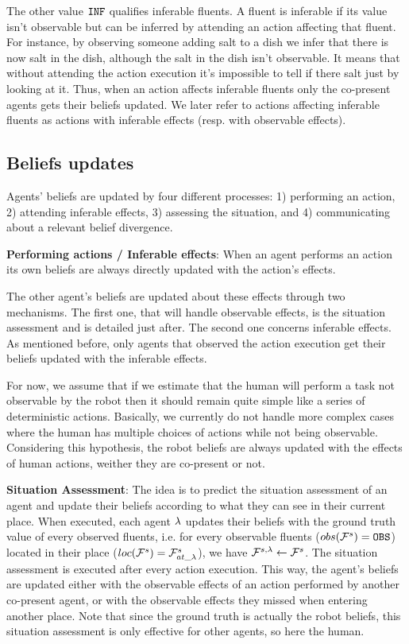 \documentclass[letterpaper]{article} %
\begin{document}
The other value $\texttt{INF}$ qualifies inferable fluents. A fluent is inferable if its value isn't observable but can be inferred by attending an action affecting that fluent. For instance, by observing someone adding salt to a dish we infer that there is now salt in the dish, although the salt in the dish isn't observable. It means that without attending the action execution it's impossible to tell if there salt just by looking at it. Thus, when an action affects inferable fluents only the co-present agents gets their beliefs updated. We later refer to actions affecting inferable fluents as actions with inferable effects (resp. with observable effects).


\subsection{Beliefs updates}

Agents' beliefs are updated by four different processes: 1) performing an action, 2) attending inferable effects, 3) assessing the situation, and 4) communicating about a relevant belief divergence.  

\textbf{Performing actions / Inferable effects}: 
When an agent performs an action its own beliefs are always directly updated with the action's effects.

The other agent's beliefs are updated about these effects through two mechanisms. The first one, that will handle observable effects, is the situation assessment and is detailed just after. 
The second one concerns inferable effects. As mentioned before, only agents that observed the action execution get their beliefs updated with the inferable effects.

For now, we assume that if we estimate that the human will perform a task not observable by the robot then it should remain quite simple like a series of deterministic actions. Basically, we currently do not handle more complex cases where the human has multiple choices of actions while not being observable. Considering this hypothesis, the robot beliefs are always updated with the effects of human actions, weither they are co-present or not.

\textbf{Situation Assessment}:
The idea is to predict the situation assessment of an agent and update their beliefs according to what they can see in their current place. When executed, each agent $\lambda$ updates their beliefs with the ground truth value of every observed fluents, i.e. for every observable fluents ($obs( \mathcal{F}^{s}_{} ) = \texttt{OBS}$) located in their place ($loc(\mathcal{F}^{s}_{}) = \mathcal{F}^{s}_{at\_\lambda}$), we have $\mathcal{F}^{s,\lambda}_{} \gets \mathcal{F}^{s}_{}$. The situation assessment is executed after every action execution. This way, the agent's beliefs are updated either with the observable effects of an action performed by another co-present agent, or with the observable effects they missed when entering another place. 
Note that since the ground truth is actually the robot beliefs, this situation assessment is only effective for other agents, so here the human. 
\end{document}
